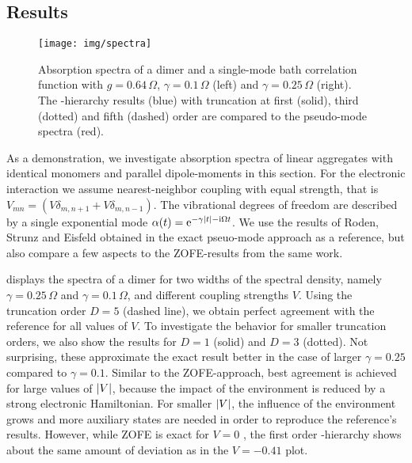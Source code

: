 \subsection{Results}
\label{sub:app.spectra.results}

\begin{figure}[p]
  \centering
  \texttt{[image: img/spectra]}
  \caption{%
    Absorption spectra of a dimer and a single-mode bath correlation function with $g = 0.64\,\Omega$, $\gamma=0.1\,\Omega$ (left) and $\gamma=0.25\,\Omega$ (right).
    The \NMSSE-hierarchy results (blue) with truncation at first (solid), third (dotted) and fifth (dashed) order are compared to the pseudo-mode spectra (red).
  }
  \label{fig:app.spectra}
\end{figure}

As a demonstration, we investigate absorption spectra of linear aggregates with identical monomers and parallel dipole-moments in this section.
For the electronic interaction we assume nearest-neighbor coupling with equal strength, that is $V_{mn} = (V\delta_{m,n+1} + V\delta_{m, n-1})$.
The vibrational degrees of freedom are described by a single exponential mode $\alpha(t) = \exp[-\gamma\abs{t} - \ii\Omega t]$.
We use the results of Roden, Strunz and Eisfeld \cite{RoStEi11_nmqsd_aggregats} obtained in the exact pseuo-mode approach as a reference, but also compare a few aspects to the \textsc{ZOFE}-results from the same work.

 displays the spectra of a dimer for two widths of the spectral density, namely $\gamma=0.25\,\Omega$ and $\gamma=0.1\,\Omega$, and different coupling strengths $V$.
Using the truncation order $D = 5$ (dashed line), we obtain perfect agreement with the reference for all values of $V$.
To investigate the behavior for smaller truncation orders, we also show the results for $D=1$ (solid) and $D=3$ (dotted).
Not surprising, these approximate the exact result better in the case of larger $\gamma=0.25$ compared to $\gamma=0.1$.
Similar to the \textsc{ZOFE}-approach, best agreement is achieved for large values of $\vert V \vert$, because the impact of the environment is reduced by a strong electronic Hamiltonian.
For smaller $\vert V \vert$, the influence of the environment grows and more auxiliary states are needed in order to reproduce the reference's results.
However, while \textsc{ZOFE} is exact for $V = 0$ \cite{RoStEi11_nmqsd_aggregats}, the first order \NMSSE-hierarchy shows about the same amount of deviation as in the $V=-0.41$ plot.


